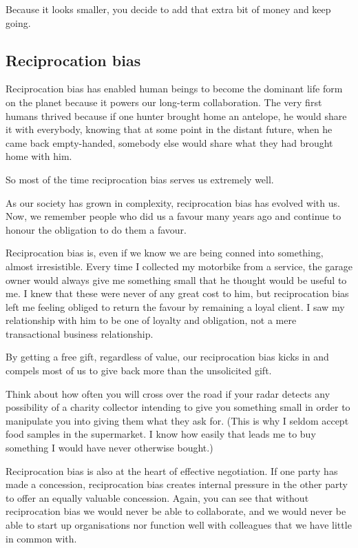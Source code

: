 Because it looks smaller, you decide to add that extra bit of money and keep going. 


\subsection{Reciprocation bias}
\label{section:reciprocity-bias}
Reciprocation bias has enabled human beings to become the dominant life form on the planet because it powers our long-term collaboration. The very first humans thrived because if one hunter brought home an antelope, he would share it with everybody, knowing that at some point in the distant future, when he came back empty-handed, somebody else would share what they had brought home with him.


So most of the time reciprocation bias serves us extremely well.


As our society has grown in complexity, reciprocation bias has evolved with us. Now, we remember people who did us a favour many years ago and continue to honour the obligation to do them a favour.


Reciprocation bias is, even if we know we are being conned into something, almost irresistible. Every time I collected my motorbike from a service, the garage owner would always give me something small that he thought would be useful to me. I knew that these were never of any great cost to him, but reciprocation bias left me feeling obliged to return the favour by remaining a loyal client. I saw my relationship with him to be one of loyalty and obligation, not a mere transactional business relationship.


By getting a free gift, regardless of value, our reciprocation bias kicks in and compels most of us to give back more than the unsolicited gift.


Think about how often you will cross over the road if your radar detects any possibility of a charity collector intending to give you something small in order to manipulate you into giving them what they ask for. (This is why I seldom accept food samples in the supermarket. I know how easily that leads me to buy something I would have never otherwise bought.)


Reciprocation bias is also at the heart of effective negotiation. If one party has made a concession, reciprocation bias creates internal pressure in the other party to offer an equally valuable concession. Again, you can see that without reciprocation bias we would never be able to collaborate, and we would never be able to start up organisations nor function well with colleagues that we have little in common with.


